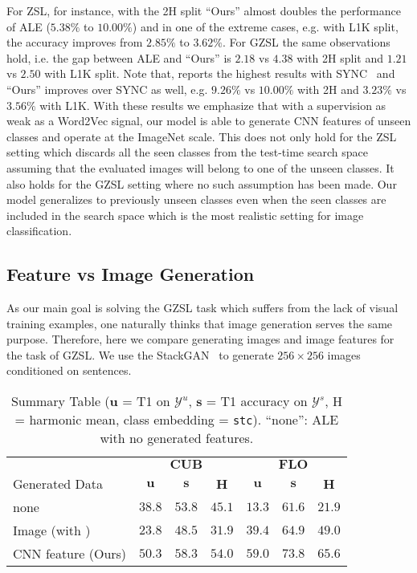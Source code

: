 \documentclass[10pt,twocolumn,letterpaper]{article}
\begin{document}
For ZSL, for instance, with the 2H split ``Ours'' almost doubles the performance of ALE ($5.38\%$ to $10.00\%$) and in one of the extreme cases, e.g. with L1K split, the accuracy improves from $2.85\%$ to $3.62\%$. For GZSL the same observations hold, i.e. the gap between ALE and ``Ours'' is $2.18$ vs $4.38$ with 2H split and $1.21$ vs $2.50$ with L1K split. Note that, \cite{XSA17} reports the highest results with SYNC~\cite{CCGS16} and ``Ours'' improves over SYNC as well, e.g. $9.26\%$ vs $10.00\%$ with 2H and $3.23\%$ vs $3.56\%$ with L1K. With these results we emphasize that with a supervision as weak as a Word2Vec signal, our model is able to generate CNN features of unseen classes and operate at the ImageNet scale. This does not only hold for the ZSL setting which discards all the seen classes from the test-time search space assuming that the evaluated images will belong to one of the unseen classes. It also holds for the GZSL setting where no such assumption has been made. Our model generalizes to previously unseen classes even when the seen classes are included in the search space which is the most realistic setting for image classification. 



\subsection{Feature vs Image Generation}

As our main goal is solving the GZSL task which suffers from the lack of visual training examples, one naturally thinks that image generation serves the same purpose. Therefore, here we compare generating images and image features for the task of GZSL. We use the StackGAN~\cite{han2017stackgan} to generate $256\times 256$ images conditioned on sentences. 




{
\setlength{\tabcolsep}{3.5pt}
\renewcommand{\arraystretch}{1.2}
\begin{table}[t]
 \centering
   \begin{tabular}{l c c c c c c}
   & \multicolumn{3}{c}{$\mathbf{CUB}$} & \multicolumn{3}{c}{$\mathbf{FLO}$} \\
   Generated Data & $\mathbf{u}$ & $\mathbf{s}$ & \textbf{H} & $\mathbf{u}$ & $\mathbf{s}$ & \textbf{H} \\ \hline
   none & $38.8$ & $53.8$ & $45.1$ & $13.3$ & $61.6$ & $21.9$ \\
Image (with \cite{han2017stackgan}) & $23.8$ & $48.5$ & $31.9$ & $39.4$ & $64.9$ & $49.0$ \\
   CNN feature (Ours) & $50.3$ & $58.3$ & $\mathbf{54.0}$ & $59.0$ & $73.8$ & $\mathbf{65.6}$ \\
\end{tabular} 
\caption{Summary Table ($\mathbf{u}$ = T1 on $\mathcal{Y}^{u}$, $\mathbf{s}$ = T1 accuracy on $\mathcal{Y}^{s}$, H = harmonic mean, class embedding = \texttt{stc}). ``none'': ALE with no generated features. 
}
\label{tab:imggen}
\end{table}
}
\end{document}
